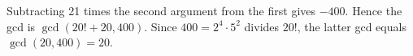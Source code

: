 Subtracting 21 times the second argument from the first gives $-400$. Hence the gcd is $\gcd(20!+20,400)$. Since $400=2^4\cdot5^2$ divides $20!$, the latter gcd equals $\gcd(20,400)=\boxed{20}$.
